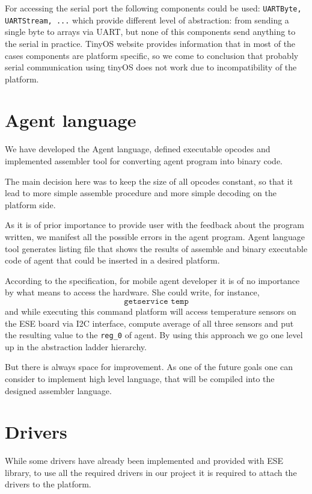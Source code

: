 \documentclass{scrreprt}
\begin{document}
For accessing the serial port the following components could be used: \texttt{UARTByte, UARTStream, ...}
which provide different level of abstraction: from sending a single byte to arrays
via UART, but none of this components send anything to the serial in practice.
TinyOS website provides information that in most of the cases components are 
platform specific, so we come to conclusion that probably serial communication
using tinyOS does not work due to incompatibility of the platform.

\section{Agent language}

We have developed the Agent language, defined executable opcodes and implemented
 assembler tool for  converting agent program 
into binary code.

The main decision here was to keep the size of all opcodes constant,
so that it lead to more simple assemble procedure and more simple decoding
on the platform side.

As it is of prior importance to provide user with the feedback about the 
program written, we manifest all the possible errors in the agent program.
Agent language tool generates listing file that shows the results of assemble and 
binary executable code of agent that could be inserted in a desired platform.

According to the specification, for mobile agent developer it is of no importance
by what means to access the hardware. She could write, for instance,
\[
\texttt{getservice temp}
\]
and while executing this command platform will access temperature
sensors on the ESE board via I2C interface, compute average of all three sensors and 
put the resulting value to the \texttt{reg_0} of agent.
By using this approach we go one level up in the abstraction ladder hierarchy.


But there is always space for improvement. As one of the future goals one 
can consider to implement high level language, that will be compiled 
into the designed assembler language.

\section{Drivers}

While some drivers have already been implemented and provided with ESE library,
to use all the required drivers in our project it is required to attach 
the drivers to the platform.
\end{document}
